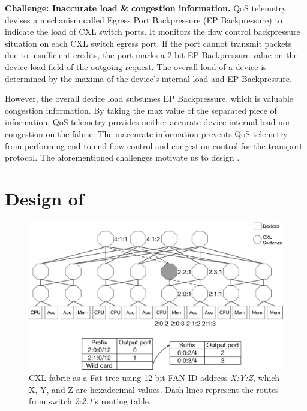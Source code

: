 \noindent \textbf{Challenge: Inaccurate load \& congestion information.}
QoS telemetry devises a mechanism called Egress Port Backpressure (EP Backpressure) to indicate the load of CXL switch ports.
%
It monitors the flow control backpressure situation on each CXL switch egress port. 
%
If the port cannot transmit packets due to insufficient credits, the port marks a 2-bit EP Backpressure value on the device load field of the outgoing request. 
%
The overall load of a device is determined by the maxima of the device's internal load and EP Backpressure. 

However, the overall device load subsumes EP Backpressure, which is valuable congestion information. 
%
By taking the max value of the separated piece of information, QoS telemetry provides neither accurate device internal load nor congestion on the fabric.
%
The inaccurate information prevents QoS telemetry from performing end-to-end flow control and congestion control for the transport protocol.
%
The aforementioned challenges motivate us to design \aurelia. 
%
\section{Design of \aurelia}
\label{aurelia:sec:design}

\begin{figure}[t!]    
    \centering
    \includegraphics[width=0.9\columnwidth]{figure/aurelia/cxl-fat-tree-routing-table.eps}
    \caption{CXL fabric as a Fat-tree using 12-bit FAN-ID address \emph{X:Y:Z}, which X, Y, and Z are hexadecimal values. Dash lines represent the routes from switch \emph{2:2:1}'s routing table.} 
    \label{fig:cxl-fabric-overview}
\end{figure}

